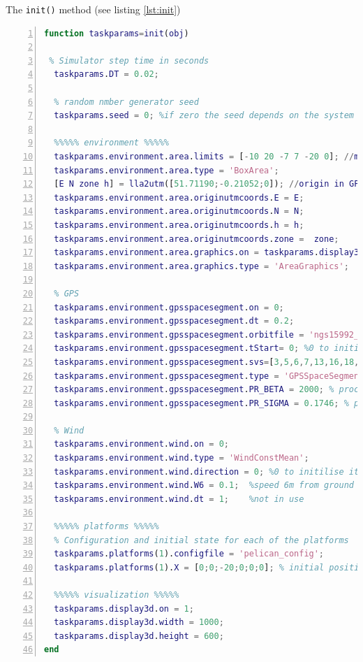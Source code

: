 \documentclass[a4paper,11pt]{report}
\begin{document}
The \texttt{init()} method (see listing \ref{lst:init}) 
\begin{lstlisting}[float=ht!bp,caption=KeepSpot init() method,language=Matlab,frame=lines,label=lst:init,numbers=left,basicstyle=\small]
function taskparams=init(obj)
 
 % Simulator step time in seconds
  taskparams.DT = 0.02;
            
  % random nmber generator seed
  taskparams.seed = 0; %if zero the seed depends on the system time         
            
  %%%%% environment %%%%%
  taskparams.environment.area.limits = [-10 20 -7 7 -20 0]; //meters
  taskparams.environment.area.type = 'BoxArea';
  [E N zone h] = lla2utm([51.71190;-0.21052;0]); //origin in GPS coords
  taskparams.environment.area.originutmcoords.E = E;
  taskparams.environment.area.originutmcoords.N = N;
  taskparams.environment.area.originutmcoords.h = h;
  taskparams.environment.area.originutmcoords.zone =  zone;
  taskparams.environment.area.graphics.on = taskparams.display3d.on;
  taskparams.environment.area.graphics.type = 'AreaGraphics';
            
  % GPS
  taskparams.environment.gpsspacesegment.on = 0; 
  taskparams.environment.gpsspacesegment.dt = 0.2;
  taskparams.environment.gpsspacesegment.orbitfile = 'ngs15992_16to17.sp3';
  taskparams.environment.gpsspacesegment.tStart= 0; %0 to initilise it randomly
  taskparams.environment.gpsspacesegment.svs=[3,5,6,7,13,16,18,19,20,22,24,29,31];
  taskparams.environment.gpsspacesegment.type = 'GPSSpaceSegmentGM';
  taskparams.environment.gpsspacesegment.PR_BETA = 2000; % process tau
  taskparams.environment.gpsspacesegment.PR_SIGMA = 0.1746; % process std
            
  % Wind
  taskparams.environment.wind.on = 0;
  taskparams.environment.wind.type = 'WindConstMean';
  taskparams.environment.wind.direction = 0; %0 to initilise it randomly
  taskparams.environment.wind.W6 = 0.1;  %speed 6m from ground in m/s
  taskparams.environment.wind.dt = 1;    %not in use
            
  %%%%% platforms %%%%%
  % Configuration and initial state for each of the platforms
  taskparams.platforms(1).configfile = 'pelican_config';
  taskparams.platforms(1).X = [0;0;-20;0;0;0]; % initial position

  %%%%% visualization %%%%%
  taskparams.display3d.on = 1;
  taskparams.display3d.width = 1000;
  taskparams.display3d.height = 600;            
end
\end{lstlisting}
\end{document}
